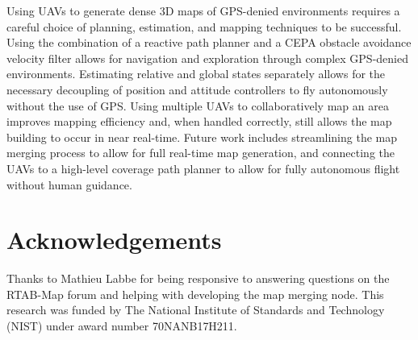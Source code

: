 \documentclass[letterpaper, 10 pt, conference]{ieeeconf}  %
\begin{document}
Using UAVs to generate dense 3D maps of GPS-denied environments requires a careful choice of planning, estimation, and mapping techniques to be successful. Using the combination of a reactive path planner and a CEPA obstacle avoidance velocity filter allows for navigation and exploration through complex GPS-denied environments. Estimating relative and global states separately allows for the necessary decoupling of position and attitude controllers to fly autonomously without the use of GPS. Using multiple UAVs to collaboratively map an area improves mapping efficiency and, when handled correctly, still allows the map building to occur in near real-time. Future work includes streamlining the map merging process to allow for full real-time map generation, and connecting the UAVs to a high-level coverage path planner to allow for fully autonomous flight without human guidance.

\section{Acknowledgements}
Thanks to Mathieu Labbe for being responsive to answering questions on the RTAB-Map forum and helping with developing the map merging node. This research was funded by The National Institute of Standards and Technology (NIST) under award number 70NANB17H211.


\end{document}
